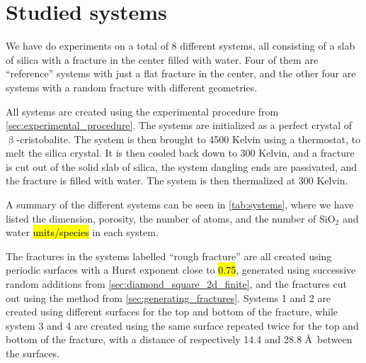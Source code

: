 \chapter{Studied systems}
%
%
%
We have do experiments on a total of 8 different systems, all consisting of a slab of silica with a fracture in the center filled with water. Four of them are ``reference'' systems with just a flat fracture in the center, and the other four are systems with a random fracture with different geometries.

All systems are created using the experimental procedure from \cref{sec:experimental_procedure}. The systems are initialized as a perfect crystal of $\upbeta$-cristobalite. The system is then brought to 4500 Kelvin using a thermostat, to melt the silica crystal. It is then cooled back down to 300 Kelvin, and a fracture is cut out of the solid slab of silica, the system dangling ends are passivated, and the fracture is filled with water. The system is then thermalized at 300 Kelvin.

A summary of the different systems can be seen in \cref{tab:systems}, where we have listed the dimension, porosity, the number of atoms, and the number of SiO$_2$ and water \hl{units/species} in each system.

The fractures in the systems labelled ``rough fracture'' are all created using periodic surfaces with a Hurst exponent close to \hl{0.75}, generated using successive random additions from \cref{sec:diamond_square_2d_finite}, and the fractures cut out using the method from \cref{sec:generating_fractures}. Systems 1 and 2 are created using different surfaces for the top and bottom of the fracture, while system 3 and 4 are created using the same surface repeated twice for the top and bottom of the fracture, with a distance of respectively 14.4 and 28.8 \AA\ between the surfaces.

